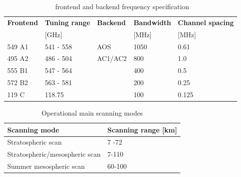 \begin{table}
\caption{ \smr\ frontend and backend frequency specification}
\label{table:config}
\begin{tabular}{|l|l|l|l|l|}
  \hline
  \textbf{Frontend} & \textbf{Tuning range} & \textbf{Backend} & \textbf{Bandwidth } & \textbf{Channel spacing} \\
                    & {[}GHz{]}             &                  & {[}MHz{]}           & {[}MHz{]}\\
  \hline
  549 A1            & 541 - 558             & AOS              & 1050                & 0.61\\
  \hline
  495 A2            & 486 - 504             & AC1/AC2          & 800                 & 1.0
 \\
 \cline{1-1}
 \cline{2-2}
 \cline{4-4}
 \cline{5-5}
  555 B1           & 547 - 564              &                 & 400                  & 0.5 \\
 \cline{1-1}
 \cline{2-2}
 \cline{4-4}
 \cline{5-5}
 572 B2            & 563 - 581              &                 & 200                  & 0.25 \\
 \cline{1-1}
 \cline{2-2}
 \cline{4-4}
 \cline{5-5}
  119 C           &  118.75                 &                 & 100                 & 0.125 \\
\hline
\end{tabular}
\end{table}

\begin{table}
\caption{Operational main scanning modes}
\label{table:scanpattern}
\begin{tabular}{|l|l|}
  \hline
  \textbf{Scanning mode} & \textbf{Scanning range {[}km{]}} \\
  \hline
  Stratospheric scan     &  7 -72 \\
 \hline
 Stratospheric/mesospheric scan &  7-110  \\
 \hline
 Summer mesospheric scan & 60-100 \\
 \hline
\end{tabular}
\end{table}




